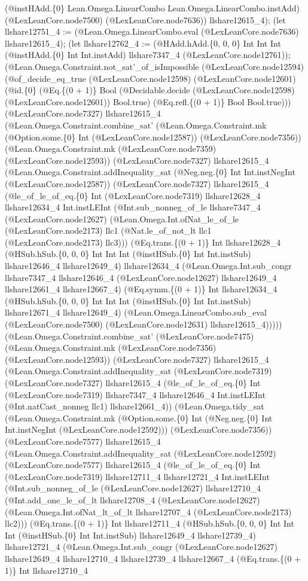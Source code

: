 \documentclass[11pt]{article}
\begin{document}
(@instHAdd.\{0\} Lean.Omega.LinearCombo Lean.Omega.LinearCombo.instAdd) (@LexLeanCore.node7500) (@LexLeanCore.node7636)) llshare12615\_4); (let llshare12751\_4 := (@Lean.Omega.LinearCombo.eval (@LexLeanCore.node7636) llshare12615\_4); (let llshare12762\_4 := (@HAdd.hAdd.\{0, 0, 0\} Int Int Int (@instHAdd.\{0\} Int Int.instAdd) llshare7347\_4 (@LexLeanCore.node12761)); (@Lean.Omega.Constraint.not\_sat'\_of\_isImpossible (@LexLeanCore.node12594) (@of\_decide\_eq\_true (@LexLeanCore.node12598) (@LexLeanCore.node12601) (@id.\{0\} (@Eq.\{(0 + 1)\} Bool (@Decidable.decide (@LexLeanCore.node12598) (@LexLeanCore.node12601)) Bool.true) (@Eq.refl.\{(0 + 1)\} Bool Bool.true))) (@LexLeanCore.node7327) llshare12615\_4 (@Lean.Omega.Constraint.combine\_sat' (@Lean.Omega.Constraint.mk (@Option.some.\{0\} Int (@LexLeanCore.node12587)) (@LexLeanCore.node7356)) (@Lean.Omega.Constraint.mk (@LexLeanCore.node7359) (@LexLeanCore.node12593)) (@LexLeanCore.node7327) llshare12615\_4 (@Lean.Omega.Constraint.addInequality\_sat (@Neg.neg.\{0\} Int Int.instNegInt (@LexLeanCore.node12587)) (@LexLeanCore.node7327) llshare12615\_4 (@le\_of\_le\_of\_eq.\{0\} Int (@LexLeanCore.node7319) llshare12628\_4 llshare12634\_4 Int.instLEInt (@Int.sub\_nonneg\_of\_le llshare7347\_4 (@LexLeanCore.node12627) (@Lean.Omega.Int.ofNat\_le\_of\_le (@LexLeanCore.node2173) llc1 (@Nat.le\_of\_not\_lt llc1 (@LexLeanCore.node2173) llc3))) (@Eq.trans.\{(0 + 1)\} Int llshare12628\_4 (@HSub.hSub.\{0, 0, 0\} Int Int Int (@instHSub.\{0\} Int Int.instSub) llshare12646\_4 llshare12649\_4) llshare12634\_4 (@Lean.Omega.Int.sub\_congr llshare7347\_4 llshare12646\_4 (@LexLeanCore.node12627) llshare12649\_4 llshare12661\_4 llshare12667\_4) (@Eq.symm.\{(0 + 1)\} Int llshare12634\_4 (@HSub.hSub.\{0, 0, 0\} Int Int Int (@instHSub.\{0\} Int Int.instSub) llshare12671\_4 llshare12649\_4) (@Lean.Omega.LinearCombo.sub\_eval (@LexLeanCore.node7500) (@LexLeanCore.node12631) llshare12615\_4))))) (@Lean.Omega.Constraint.combine\_sat' (@LexLeanCore.node7475) (@Lean.Omega.Constraint.mk (@LexLeanCore.node7356) (@LexLeanCore.node12593)) (@LexLeanCore.node7327) llshare12615\_4 (@Lean.Omega.Constraint.addInequality\_sat (@LexLeanCore.node7319) (@LexLeanCore.node7327) llshare12615\_4 (@le\_of\_le\_of\_eq.\{0\} Int (@LexLeanCore.node7319) llshare7347\_4 llshare12646\_4 Int.instLEInt (@Int.natCast\_nonneg llc1) llshare12661\_4)) (@Lean.Omega.tidy\_sat (@Lean.Omega.Constraint.mk (@Option.some.\{0\} Int (@Neg.neg.\{0\} Int Int.instNegInt (@LexLeanCore.node12592))) (@LexLeanCore.node7356)) (@LexLeanCore.node7577) llshare12615\_4 (@Lean.Omega.Constraint.addInequality\_sat (@LexLeanCore.node12592) (@LexLeanCore.node7577) llshare12615\_4 (@le\_of\_le\_of\_eq.\{0\} Int (@LexLeanCore.node7319) llshare12711\_4 llshare12721\_4 Int.instLEInt (@Int.sub\_nonneg\_of\_le (@LexLeanCore.node12627) llshare12710\_4 (@Int.add\_one\_le\_of\_lt llshare12708\_4 (@LexLeanCore.node12627) (@Lean.Omega.Int.ofNat\_lt\_of\_lt llshare12707\_4 (@LexLeanCore.node2173) llc2))) (@Eq.trans.\{(0 + 1)\} Int llshare12711\_4 (@HSub.hSub.\{0, 0, 0\} Int Int Int (@instHSub.\{0\} Int Int.instSub) llshare12649\_4 llshare12739\_4) llshare12721\_4 (@Lean.Omega.Int.sub\_congr (@LexLeanCore.node12627) llshare12649\_4 llshare12710\_4 llshare12739\_4 llshare12667\_4 (@Eq.trans.\{(0 + 1)\} Int llshare12710\_4 
\end{document}
